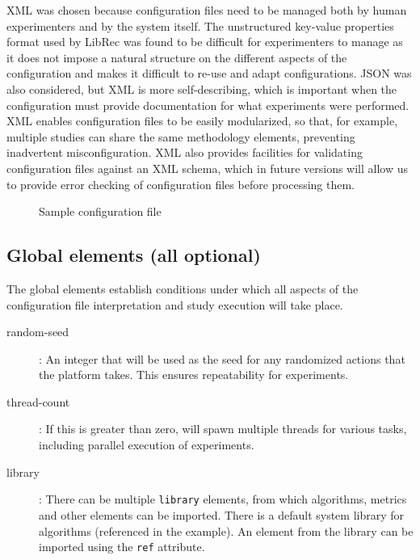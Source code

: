 XML was chosen because configuration files need to be managed both by human experimenters and by the system itself. The unstructured key-value properties format used by LibRec was found to be difficult for experimenters to manage as it does not impose a natural structure on the different aspects of the configuration and makes it difficult to re-use and adapt configurations. JSON was also considered, but XML is more self-describing, which is important when the configuration must provide documentation for what experiments were performed. XML enables configuration files to be easily modularized, so that, for example, multiple studies can share the same methodology elements, preventing inadvertent misconfiguration. XML also provides facilities for validating configuration files against an XML schema, which in future versions will allow us to provide error checking of configuration files before processing them.

\begin{figure}[ht]
    \centering
    
    \caption{Sample configuration file}
    \label{fig:config}
    \vspace{-0.5in}
\end{figure}




\subsection{Global elements (all optional)}
\label{subsec:lib_auto_global_elements}
The global elements establish conditions under which all aspects of the configuration file interpretation and study execution will take place.

\begin{description}
\item[random-seed]: An integer that will be used as the seed for any randomized actions that the platform takes. This ensures repeatability for experiments.
\item[thread-count]: If this is greater than zero, \libauto{} will spawn multiple threads for various tasks, including parallel execution of experiments.
\item[library]: There can be multiple \texttt{library} elements, from which algorithms, metrics and other elements can be imported. There is a default system library for algorithms (referenced in the example). An element from the library can be imported using the \texttt{ref} attribute.
\end{description}

